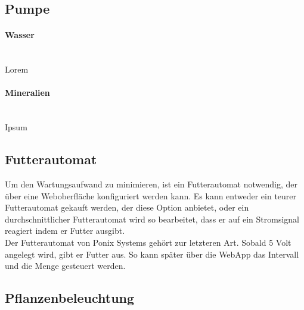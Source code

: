 \documentclass[11pt]{article}
\begin{document}
\subsection{Pumpe}
\paragraph{Wasser}\mbox{} \\
Lorem
\paragraph{Mineralien}\mbox{} \\
Ipsum
\subsection{Futterautomat}
Um den Wartungsaufwand zu minimieren, ist ein Futterautomat notwendig, der über eine Weboberfläche konfiguriert werden kann. Es kann entweder ein teurer Futterautomat gekauft werden, der diese Option anbietet, oder ein durchschnittlicher Futterautomat wird so bearbeitet, dass er auf ein Stromsignal reagiert indem er Futter ausgibt. \\
Der Futterautomat von Ponix Systems gehört zur letzteren Art. Sobald 5 Volt angelegt wird, gibt er Futter aus. So kann später über die WebApp das Intervall und die Menge gesteuert werden.
\subsection{Pflanzenbeleuchtung}
\end{document}

